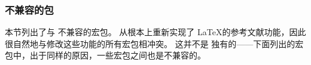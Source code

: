 \subsubsection{不兼容的包}
\label{int:pre:inc}


本节列出了与 \biblatex 不兼容的宏包。
\biblatex 从根本上重新实现了 \LaTeX 的参考文献功能，因此很自然地与修改这些功能的所有宏包相冲突。
这并不是 \biblatex 独有的——下面列出的宏包中，出于同样的原因，一些宏包之间也是不兼容的。

